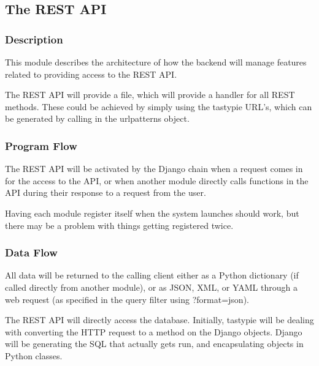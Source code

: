 
\subsection{The \ac{REST} \ac{API}}

\subsubsection{Description}

This module describes the architecture of how the backend will manage features related to providing access to the \ac{REST} \ac{API}.

The \ac{REST} \ac{API} will provide a  file, which will provide a handler for all \ac{REST} methods.
These could be achieved by simply using the tastypie \ac{URL}'s, which can be generated by calling  in the urlpatterns object.

\subsubsection{Program Flow}

The \ac{REST} \ac{API} will be activated by the Django chain when a request comes in for the access to the \ac{API}, or when another module directly calls functions in the \ac{API} during their response to a request from the user.

Having each module register itself when the system launches should work, but there may be a problem with things getting registered twice.


\subsubsection{Data Flow}

All data will be returned to the calling client either as a Python dictionary (if called directly from another module), or as \ac{JSON}, \ac{XML}, or \ac{YAML} through a web request (as specified in the query filter using ?format=json).

The \ac{REST} \ac{API} will directly access the database.
Initially, tastypie will be dealing with converting the \ac{HTTP} request to a method on the Django objects.
Django will be generating the \ac{SQL} that actually gets run, and encapsulating objects in Python classes.


